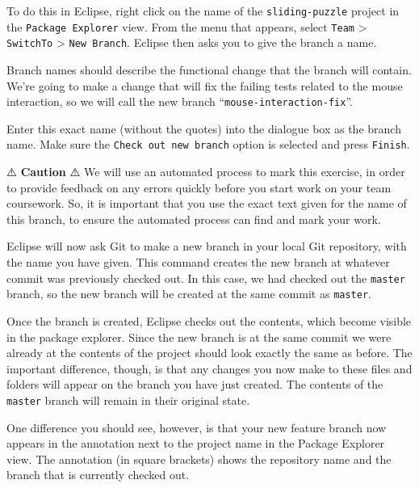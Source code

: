 \documentclass[
]{book}
\begin{document}
To do this in Eclipse, right click on the name of the \texttt{sliding-puzzle} project in the \texttt{Package\ Explorer} view. From the menu that appears, select \texttt{Team} \textgreater{} \texttt{SwitchTo} \textgreater{} \texttt{New\ Branch}. Eclipse then asks you to give the branch a name.

Branch names should describe the functional change that the branch will contain. We're going to make a change that will fix the failing tests related to the mouse interaction, so we will call the new branch ``\texttt{mouse-interaction-fix}''.

Enter this exact name (without the quotes) into the dialogue box as the branch name. Make sure the \texttt{Check\ out\ new\ branch} option is selected and press \texttt{Finish}.

⚠️ \textbf{Caution} ⚠️
We will use an automated process to mark this exercise, in order to provide feedback on any errors quickly before you start work on your team coursework. So, it is important that you use the exact text given for the name of this branch, to ensure the automated process can find and mark your work.

Eclipse will now ask Git to make a new branch in your local Git repository, with the name you have given. This command creates the new branch at whatever commit was previously checked out. In this case, we had checked out the \texttt{master} branch, so the new branch will be created at the same commit as \texttt{master}.

Once the branch is created, Eclipse checks out the contents, which become visible in the package explorer. Since the new branch is at the same commit we were already at the contents of the project should look exactly the same as before. The important difference, though, is that any changes you now make to these files and folders will appear on the branch you have just created. The contents of the \texttt{master} branch will remain in their original state.

One difference you should see, however, is that your new feature branch now appears in the annotation next to the project name in the Package Explorer view. The annotation (in square brackets) shows the repository name and the branch that is currently checked out.
\end{document}
